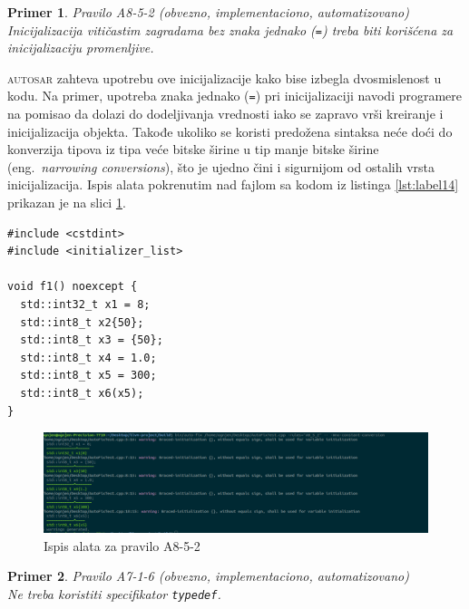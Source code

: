 \documentclass[12pt,oneside]{memoir}
\newtheorem{primer}{Primer}[section]
\begin{document}
\begin{primer}
Pravilo A8-5-2 (obvezno, implementaciono, automatizovano) \\
Inicijalizacija viti\v{c}astim zagradama bez znaka jednako (\texttt{=}) treba biti kori\v{s}\'{c}ena za inicijalizaciju promenljive.
\end{primer}

\textsc{autosar} zahteva upotrebu ove inicijalizacije kako bise izbegla dvosmislenost u kodu. Na primer, upotreba znaka jednako (\texttt{=}) pri
inicijalizaciji navodi programere na pomisao da dolazi do dodeljivanja vrednosti iako se zapravo vr\v{s}i kreiranje i inicijalizacija objekta.
Takođe ukoliko se koristi predo\v{z}ena sintaksa ne\'{c}e do\'{c}i do konverzija tipova iz tipa ve\'{c}e bitske \v{s}irine u tip manje bitske \v{s}irine (eng.~\textit{narrowing conversions}),
\v{s}to je ujedno \v{c}ini i sigurnijom od ostalih vrsta inicijalizacija. Ispis alata pokrenutim nad fajlom sa kodom iz listinga \ref{lst:label14} prikazan je na slici \ref{fig:A8-5-2}. \\

\begin{lstlisting}[style=customc, caption={Primer koda koji nije napisan u skladu sa pravilom A8-5-2.}, label=lst:label14]
#include <cstdint>
#include <initializer_list>

void f1() noexcept {
  std::int32_t x1 = 8;
  std::int8_t x2{50};
  std::int8_t x3 = {50};
  std::int8_t x4 = 1.0;
  std::int8_t x5 = 300;
  std::int8_t x6(x5);
}
\end{lstlisting}

\begin{figure}[!h]
\begin{center}
\includegraphics[scale=0.3]{A8-5-2.png}
\end{center}
\caption{Ispis alata za pravilo A8-5-2}
\label{fig:A8-5-2}
\end{figure}

\begin{primer}
Pravilo A7-1-6 (obvezno, implementaciono, automatizovano) \\
Ne treba koristiti specifikator \texttt{typedef}. 
\end{primer}
\end{document}
